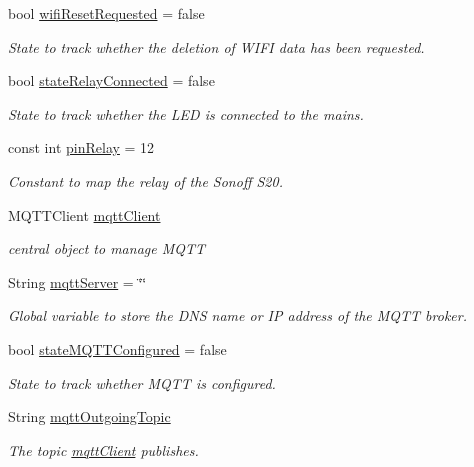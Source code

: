 \begin{DoxyCompactItemize}
bool \hyperlink{WIFIOnOff_8ino_a1ef1b3b96ca3b7c432a5c202037bcd43}{wifi\-Reset\-Requested} = false
\begin{DoxyCompactList}\small\item\em State to track whether the deletion of W\-I\-F\-I data has been requested. \end{DoxyCompactList}\item 
bool \hyperlink{WIFIOnOff_8ino_a48a5ee80a30c37768bf1e198f1ee5692}{state\-Relay\-Connected} = false
\begin{DoxyCompactList}\small\item\em State to track whether the L\-E\-D is connected to the mains. \end{DoxyCompactList}\item 
const int \hyperlink{WIFIOnOff_8ino_aa4021c86d826785a0f0bcac11a38d30e}{pin\-Relay} = 12
\begin{DoxyCompactList}\small\item\em Constant to map the relay of the Sonoff S20. \end{DoxyCompactList}\item 
M\-Q\-T\-T\-Client \hyperlink{WIFIOnOff_8ino_a0524591f2a058a4f26f16579245db356}{mqtt\-Client}
\begin{DoxyCompactList}\small\item\em central object to manage M\-Q\-T\-T \end{DoxyCompactList}\item 
String \hyperlink{WIFIOnOff_8ino_a020889fcca6224d14f4d3f4241ca4467}{mqtt\-Server} = \char`\"{}\char`\"{}
\begin{DoxyCompactList}\small\item\em Global variable to store the D\-N\-S name or I\-P address of the M\-Q\-T\-T broker. \end{DoxyCompactList}\item 
bool \hyperlink{WIFIOnOff_8ino_a3f27c574110acbefe064ca29a7ce289d}{state\-M\-Q\-T\-T\-Configured} = false
\begin{DoxyCompactList}\small\item\em State to track whether M\-Q\-T\-T is configured. \end{DoxyCompactList}\item 
String \hyperlink{WIFIOnOff_8ino_a2311f2b74fe46d3f9e8072b3694deee5}{mqtt\-Outgoing\-Topic}
\begin{DoxyCompactList}\small\item\em The topic \hyperlink{WIFIOnOff_8ino_a0524591f2a058a4f26f16579245db356}{mqtt\-Client} publishes. \end{DoxyCompactList}\item 

\end{DoxyCompactItemize}
